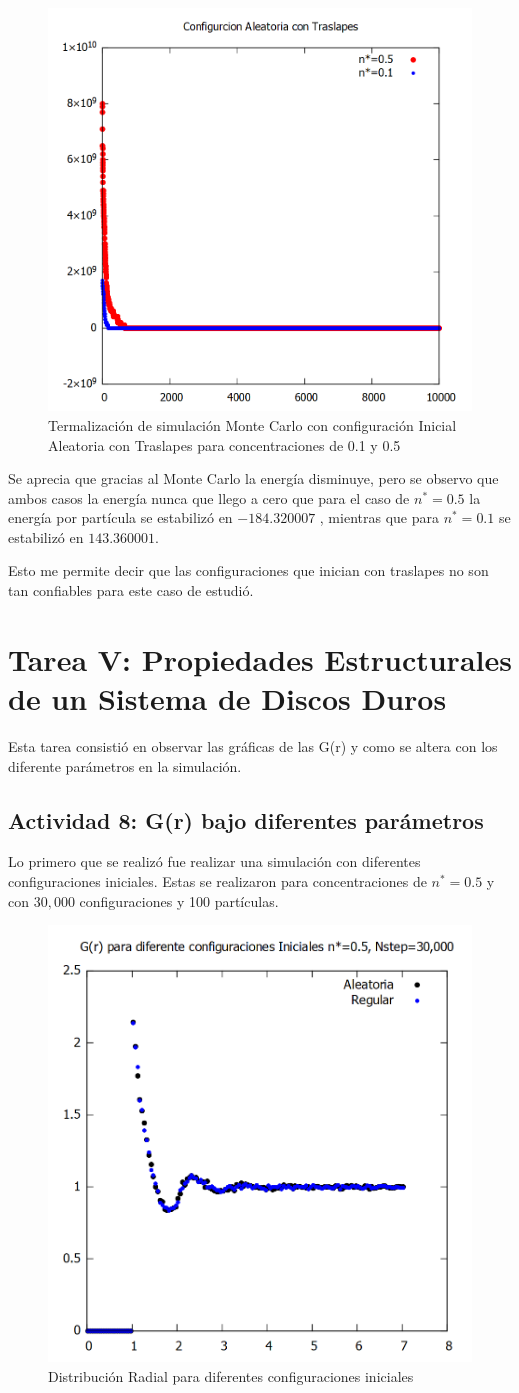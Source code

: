 \documentclass[12pt,letterpaper]{article}
\begin{document}
\begin{figure}[H]
	\centering
	\includegraphics[width=0.50\linewidth]{traslapes.png}
	\caption{Termalización  de simulación Monte Carlo con configuración Inicial Aleatoria con Traslapes para concentraciones de 0.1 y 0.5}
	\label{TermaTras}
\end{figure}
 Se aprecia que gracias al Monte Carlo la energía disminuye, pero se observo que ambos casos la energía nunca que llego a cero que para el caso de $n^*=0.5$ la energía por partícula se estabilizó en $-184.320007$ , mientras que para $n^*=0.1$ se estabilizó en $143.360001$.
 
 Esto me permite decir que las configuraciones que inician con traslapes no son tan confiables para este caso de estudió.

 \pagebreak

\section*{Tarea V: Propiedades	Estructurales	de	un	Sistema	de	Discos	Duros}
Esta tarea consistió en observar las gráficas de las G(r) y como se altera con los diferente parámetros en la simulación.

\subsection*{Actividad 8: G(r) bajo diferentes parámetros}
Lo primero que  se realizó fue realizar una simulación con diferentes configuraciones iniciales. Estas se realizaron para concentraciones de $n^*=0.5$ y con  $30,000$ configuraciones y 100 partículas.

\begin{figure}[H]
	\centering
	\includegraphics[width=0.50\linewidth]{gdrCNF.png}
	\caption{Distribución Radial para diferentes configuraciones iniciales}
	\label{GDR_Config}
\end{figure}
\end{document}
